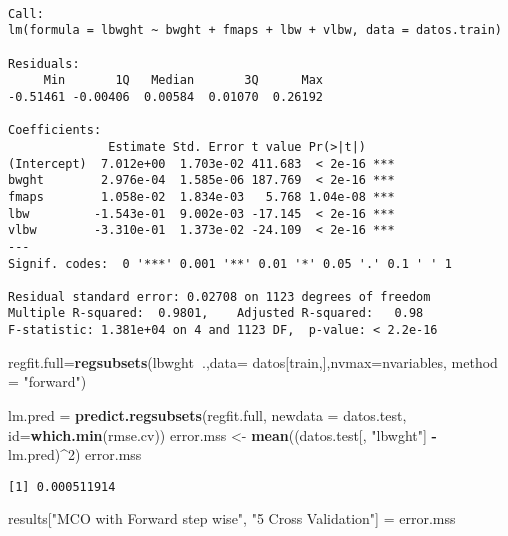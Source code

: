 \documentclass[]{article}
\newenvironment{Shaded}{\begin{snugshade}}{\end{snugshade}}
\newcommand{\KeywordTok}[1]{\textcolor[rgb]{0.13,0.29,0.53}{\textbf{#1}}}
\newcommand{\DataTypeTok}[1]{\textcolor[rgb]{0.13,0.29,0.53}{#1}}
\newcommand{\DecValTok}[1]{\textcolor[rgb]{0.00,0.00,0.81}{#1}}
\newcommand{\StringTok}[1]{\textcolor[rgb]{0.31,0.60,0.02}{#1}}
\newcommand{\OperatorTok}[1]{\textcolor[rgb]{0.81,0.36,0.00}{\textbf{#1}}}
\newcommand{\NormalTok}[1]{#1}
\begin{document}
\begin{verbatim}

Call:
lm(formula = lbwght ~ bwght + fmaps + lbw + vlbw, data = datos.train)

Residuals:
     Min       1Q   Median       3Q      Max 
-0.51461 -0.00406  0.00584  0.01070  0.26192 

Coefficients:
              Estimate Std. Error t value Pr(>|t|)    
(Intercept)  7.012e+00  1.703e-02 411.683  < 2e-16 ***
bwght        2.976e-04  1.585e-06 187.769  < 2e-16 ***
fmaps        1.058e-02  1.834e-03   5.768 1.04e-08 ***
lbw         -1.543e-01  9.002e-03 -17.145  < 2e-16 ***
vlbw        -3.310e-01  1.373e-02 -24.109  < 2e-16 ***
---
Signif. codes:  0 '***' 0.001 '**' 0.01 '*' 0.05 '.' 0.1 ' ' 1

Residual standard error: 0.02708 on 1123 degrees of freedom
Multiple R-squared:  0.9801,    Adjusted R-squared:   0.98 
F-statistic: 1.381e+04 on 4 and 1123 DF,  p-value: < 2.2e-16
\end{verbatim}

\begin{Shaded}
\begin{Highlighting}[]
\NormalTok{regfit.full=}\KeywordTok{regsubsets}\NormalTok{(lbwght}\OperatorTok{~}\NormalTok{.,}\DataTypeTok{data=}\NormalTok{ datos[train,],}\DataTypeTok{nvmax=}\NormalTok{nvariables, }\DataTypeTok{method =} \StringTok{"forward"}\NormalTok{)}

\NormalTok{lm.pred =}\StringTok{ }\KeywordTok{predict.regsubsets}\NormalTok{(regfit.full, }\DataTypeTok{newdata =}\NormalTok{ datos.test, }\DataTypeTok{id=}\KeywordTok{which.min}\NormalTok{(rmse.cv))}
\NormalTok{error.mss <-}\StringTok{ }\KeywordTok{mean}\NormalTok{((datos.test[, }\StringTok{"lbwght"}\NormalTok{] }\OperatorTok{-}\StringTok{ }\NormalTok{lm.pred)}\OperatorTok{^}\DecValTok{2}\NormalTok{)}
\NormalTok{error.mss }
\end{Highlighting}
\end{Shaded}

\begin{verbatim}
[1] 0.000511914
\end{verbatim}

\begin{Shaded}
\begin{Highlighting}[]
\NormalTok{results[}\StringTok{"MCO with Forward step wise"}\NormalTok{, }\StringTok{"5 Cross Validation"}\NormalTok{] =}\StringTok{ }\NormalTok{error.mss}
\end{Highlighting}
\end{Shaded}
\end{document}
